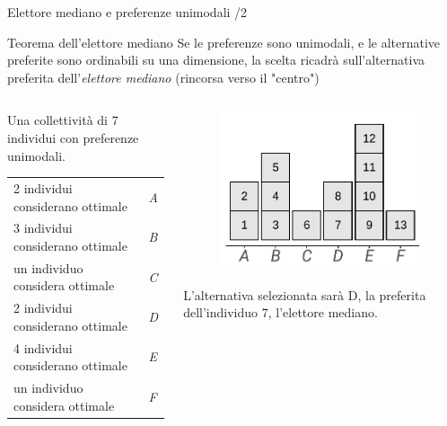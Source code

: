 \documentclass[aspectratio=64,12pt]{beamer}
\begin{document}
\begin{frame}{Elettore mediano e preferenze unimodali /2}
\begin{block}{Teorema dell'elettore mediano}
Se le preferenze sono unimodali, e le alternative preferite sono ordinabili
 su una dimensione, la scelta ricadrà sull'alternativa preferita
 dell'\emph{elettore mediano} (rincorsa verso il "centro")
\end{block}
\vspace{-3mm}

\begin{columns}
\begin{column}{.5\columnwidth}
Una collettività di 7 individui con preferenze unimodali.
\medskip

\begin{tabular}[c]{ll}
  2 individui considerano ottimale&\emph{A}\\
  3 individui considerano ottimale&\emph{B}\\
  un individuo considera ottimale &\emph{C}\\
  2 individui considerano ottimale &\emph{D}\\
  4 individui considerano ottimale &\emph{E}\\
  un individuo considera ottimale &\emph{F}
\end{tabular}
\end{column}

\begin{column}{.5\columnwidth}
\begin{figure}[htbp]
\centering
\includegraphics[width=.75\textwidth]{./figure/elettore-mediano-distribuzione.pdf}
\end{figure}
\vspace{-2mm}
\footnotesize
L'alternativa selezionata sarà D, la preferita dell'individuo 7, l'elettore mediano.
\end{column}
\end{columns}
\end{frame}
\end{document}
